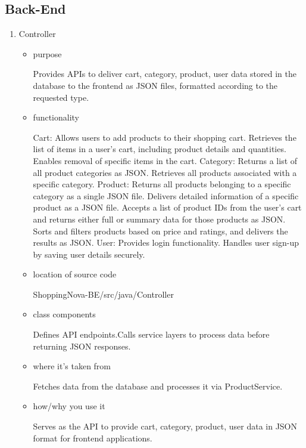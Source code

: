 \documentclass[conference]{IEEEtran}
\begin{document}
\subsection{Back-End}
\begin{enumerate}
\setlength{\parindent}{2ex}
\item Controller

\begin{itemize}
\item purpose

Provides APIs to deliver cart, category, product, user data stored in the database to the frontend as JSON files, formatted according to the requested type.

\item functionality

Cart: Allows users to add products to their shopping cart. Retrieves the list of items in a user's cart, including product details and quantities. Enables removal of specific items in the cart.\newline
Category: Returns a list of all product categories as JSON. Retrieves all products associated with a specific category.\newline 
Product:
Returns all products belonging to a specific category as a single JSON file.
Delivers detailed information of a specific product as a JSON file.
Accepts a list of product IDs from the user's cart and returns either full or summary data for those products as JSON.
Sorts and filters products based on price and ratings, and delivers the results as JSON. \newline
User: Provides login functionality. Handles user sign-up by saving user details securely.

\item location of source code

ShoppingNova-BE/src/java/Controller

\item class components

Defines API endpoints.\newline Calls service layers to process data before returning JSON responses.

\item where it's taken from

Fetches data from the database and processes it via ProductService.

\item how/why you use it

Serves as the API to provide cart, category, product, user data in JSON format for frontend applications.
\end{itemize}


\end{enumerate}
\end{document}
